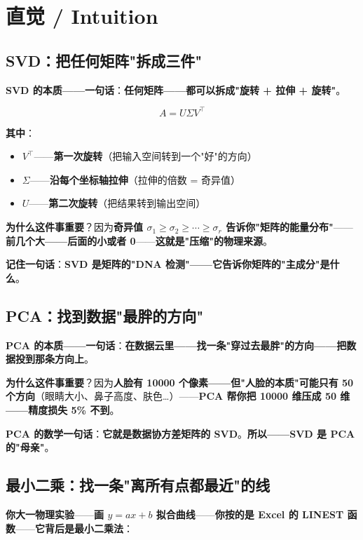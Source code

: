 \section{直觉 / Intuition}

\subsection{SVD：把任何矩阵"拆成三件"}

\textbf{SVD 的本质——一句话}：\textbf{任何矩阵——都可以拆成"旋转 + 拉伸 + 旋转"}。

\[
A = U \Sigma V^{\!\top}
\]

\textbf{其中}：
\begin{itemize}
\item \textbf{$V^{\!\top}$}——\textbf{第一次旋转}（把输入空间转到一个"好"的方向）
\item \textbf{$\Sigma$}——\textbf{沿每个坐标轴拉伸}（拉伸的倍数 = 奇异值）
\item \textbf{$U$}——\textbf{第二次旋转}（把结果转到输出空间）
\end{itemize}

\textbf{为什么这件事重要}？因为\textbf{奇异值 $\sigma_1 \ge \sigma_2 \ge \cdots \ge \sigma_r$ 告诉你"矩阵的能量分布"}——\textbf{前几个大——后面的小或者 0}——\textbf{这就是"压缩"的物理来源}。

\textbf{记住一句话}：\textbf{SVD 是矩阵的"DNA 检测"——它告诉你矩阵的"主成分"是什么}。

\subsection{PCA：找到数据"最胖的方向"}

\textbf{PCA 的本质——一句话}：\textbf{在数据云里——找一条"穿过去最胖"的方向——把数据投到那条方向上}。

\textbf{为什么这件事重要}？因为\textbf{人脸有 10000 个像素——但"人脸的本质"可能只有 50 个方向}（眼睛大小、鼻子高度、肤色\dots）——\textbf{PCA 帮你把 10000 维压成 50 维——精度损失 5\% 不到}。

\textbf{PCA 的数学一句话}：\textbf{它就是数据协方差矩阵的 SVD}。\textbf{所以——SVD 是 PCA 的"母亲"}。

\subsection{最小二乘：找一条"离所有点都最近"的线}

\textbf{你大一物理实验}——\textbf{画 $y = ax + b$ 拟合曲线}——\textbf{你按的是 Excel 的 LINEST 函数}——\textbf{它背后是最小二乘法}：

